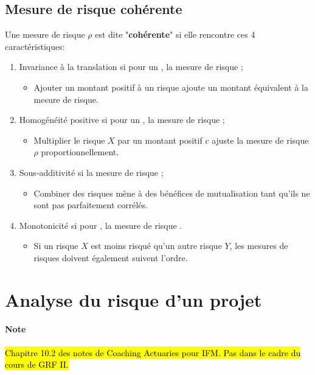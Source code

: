 \documentclass[10pt, french]{article}
\begin{document}
\begin{multicols*}{2}
\subsection*{Mesure de risque cohérente}
Une mesure de risque $\rho$ est dite "\textbf{cohérente}" si elle rencontre ces 4 caractéristiques:
\begin{enumerate}[leftmargin = *]
	\item	Invariance à la translation si pour un , la mesure de risque ;
		\begin{itemize}[leftmargin = *]
		\item	Ajouter un montant positif à un risque ajoute un montant équivalent à la mesure de risque.
		\end{itemize}
	\item	Homogénéité positive si pour un , la mesure de risque ;
		\begin{itemize}[leftmargin = *]
		\item	Multiplier le risque $X$ par un montant positif $c$ ajuste la mesure de risque $\rho$ proportionnellement.
		\end{itemize}
	\item	Sous-additivité si la mesure de risque ;
		\begin{itemize}[leftmargin = *]
		\item	Combiner des risques mène à des bénéfices de mutualisation tant qu'ils ne sont pas parfaitement corrélés.
		\end{itemize}
	\item	Monotonicité si pour , la mesure de risque .
		\begin{itemize}[leftmargin = *]
		\item	Si un risque $X$ est moins risqué qu'un autre risque $Y$, les mesures de risques doivent également suivent l'ordre.
		\end{itemize}
\end{enumerate}

\columnbreak

\section*{Analyse du risque d'un projet}
\paragraph{Note}	\hl{Chapitre 10.2 des notes de Coaching Actuaries pour IFM. Pas dans le cadre du cours de GRF II.}


\end{multicols*}
\end{document}
